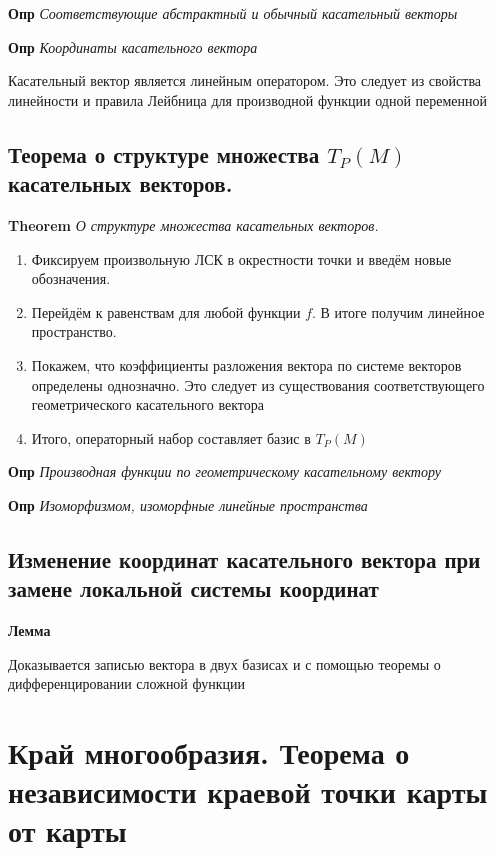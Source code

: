 \documentclass[a4paper, 14pt]{article}
\begin{document}
    \textbf{Опр} \textit{Соответствующие абстрактный и обычный касательный векторы}
    
    \textbf{Опр} \textit{Координаты касательного вектора}
    
    Касательный вектор является линейным оператором.
    Это следует из свойства линейности и правила Лейбница для производной функции одной переменной
    
    \subsection{Теорема о структуре множества $T_P (M)$ касательных векторов.}
    
    \textbf{Theorem} \textit{О структуре множества касательных векторов.}
    
    \begin{enumerate}
        \item Фиксируем произвольную ЛСК в окрестности точки и введём новые обозначения.
        \item Перейдём к равенствам для любой функции $f$.
        В итоге получим линейное пространство.
        \item Покажем, что коэффициенты разложения вектора по системе векторов определены однозначно.
        Это следует из существования соответствующего геометрического касательного вектора
        \item Итого, операторный набор составляет базис в $T_P (M)$
    \end{enumerate}
    
    \textbf{Опр} \textit{Производная функции по геометрическому касательному вектору}
    
    \textbf{Опр} \textit{Изоморфизмом, изоморфные линейные пространства}
    
    \subsection{Изменение координат касательного вектора при замене локальной системы координат}
    
    \textbf{Лемма}
    
    Доказывается записью вектора в двух базисах и с помощью теоремы о дифференцировании сложной функции
    
    \section{Край многообразия.
    Теорема о независимости краевой точки карты от карты}
    
\end{document}
